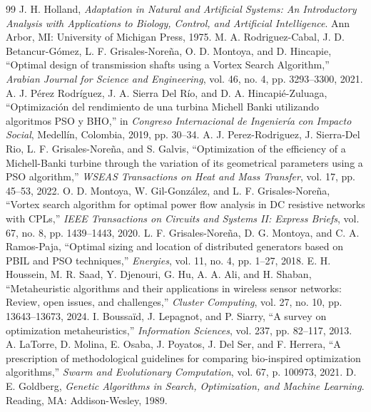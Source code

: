\documentclass[conference]{IEEEtran}
\begin{document}
\begin{thebibliography}{99}
 J. H. Holland, \emph{Adaptation in Natural and Artificial Systems: An Introductory Analysis with Applications to Biology, Control, and Artificial Intelligence}. Ann Arbor, MI: University of Michigan Press, 1975.
 M. A. Rodriguez-Cabal, J. D. Betancur-G\'omez, L. F. Grisales-Nore\~na, O. D. Montoya, and D. Hincapie, ``Optimal design of transmission shafts using a Vortex Search Algorithm,'' \emph{Arabian Journal for Science and Engineering}, vol. 46, no. 4, pp. 3293--3300, 2021.
 A. J. P\'erez Rodr\'iguez, J. A. Sierra Del R\'io, and D. A. Hincapi\'e-Zuluaga, ``Optimizaci\'on del rendimiento de una turbina Michell Banki utilizando algoritmos PSO y BHO,'' in \emph{Congreso Internacional de Ingenier\'ia con Impacto Social}, Medell\'in, Colombia, 2019, pp. 30--34.
 A. J. Perez-Rodriguez, J. Sierra-Del Rio, L. F. Grisales-Nore\~na, and S. Galvis, ``Optimization of the efficiency of a Michell-Banki turbine through the variation of its geometrical parameters using a PSO algorithm,'' \emph{WSEAS Transactions on Heat and Mass Transfer}, vol. 17, pp. 45--53, 2022.
 O. D. Montoya, W. Gil-Gonz\'alez, and L. F. Grisales-Nore\~na, ``Vortex search algorithm for optimal power flow analysis in DC resistive networks with CPLs,'' \emph{IEEE Transactions on Circuits and Systems II: Express Briefs}, vol. 67, no. 8, pp. 1439--1443, 2020.
 L. F. Grisales-Nore\~na, D. G. Montoya, and C. A. Ramos-Paja, ``Optimal sizing and location of distributed generators based on PBIL and PSO techniques,'' \emph{Energies}, vol. 11, no. 4, pp. 1--27, 2018.
 E. H. Houssein, M. R. Saad, Y. Djenouri, G. Hu, A. A. Ali, and H. Shaban, ``Metaheuristic algorithms and their applications in wireless sensor networks: Review, open issues, and challenges,'' \emph{Cluster Computing}, vol. 27, no. 10, pp. 13643--13673, 2024.
 I. Boussa\"id, J. Lepagnot, and P. Siarry, ``A survey on optimization metaheuristics,'' \emph{Information Sciences}, vol. 237, pp. 82--117, 2013.
 A. LaTorre, D. Molina, E. Osaba, J. Poyatos, J. Del Ser, and F. Herrera, ``A prescription of methodological guidelines for comparing bio-inspired optimization algorithms,'' \emph{Swarm and Evolutionary Computation}, vol. 67, p. 100973, 2021.
 D. E. Goldberg, \emph{Genetic Algorithms in Search, Optimization, and Machine Learning}. Reading, MA: Addison-Wesley, 1989.

\end{thebibliography}
\end{document}
